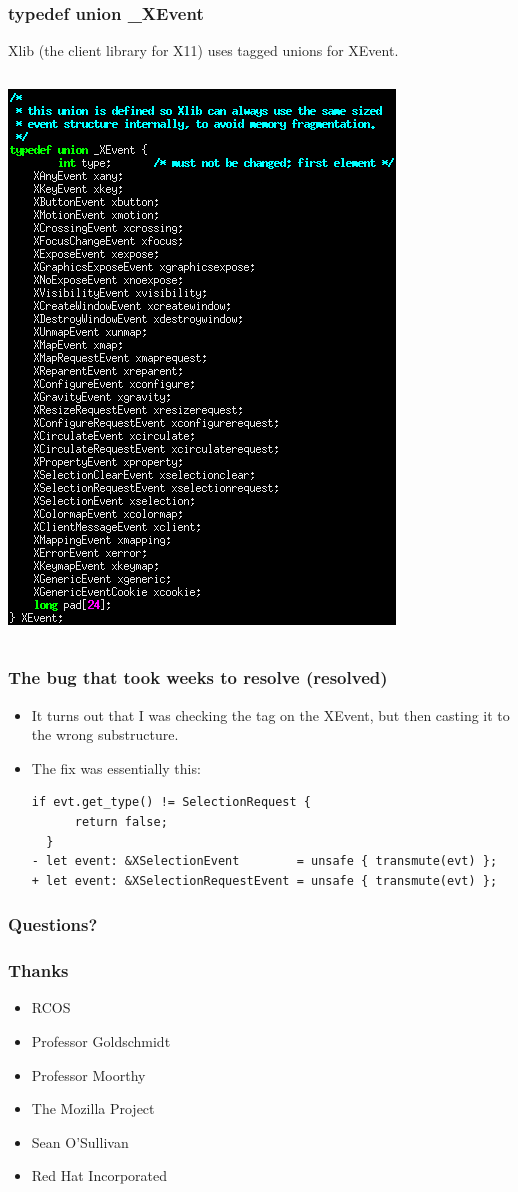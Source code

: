 \documentclass{beamer}
\begin{document}
\begin{frame}[fragile]
\frametitle{typedef union \_XEvent}
Xlib (the client library for X11) uses tagged unions for XEvent.
\begin{columns}
\begin{column}{0.5\textwidth}
\includegraphics[height=0.8\textheight]{typedef_union_xevent.png}
\end{column}
\end{columns}
\end{frame}

\begin{frame}[fragile]
\frametitle{The bug that took weeks to resolve (resolved)}
\begin{itemize}
\item
It turns out that I was checking the tag on the XEvent, but then casting it to the wrong substructure.
\item
The fix was essentially this:
\begin{Verbatim}[frame=single, fontsize=\scriptsize]
  if evt.get_type() != SelectionRequest {
      return false;
  }
- let event: &XSelectionEvent        = unsafe { transmute(evt) };
+ let event: &XSelectionRequestEvent = unsafe { transmute(evt) };
\end{Verbatim}
\end{itemize}
\end{frame}

\begin{frame}[fragile]
\frametitle{Questions?}
\end{frame}

\begin{frame}[fragile]
\frametitle{Thanks}
\begin{itemize}
\item RCOS
\item Professor Goldschmidt
\item Professor Moorthy
\item The Mozilla Project
\item Sean O'Sullivan
\item Red Hat Incorporated
\end{itemize}
\end{frame}
\end{document}
